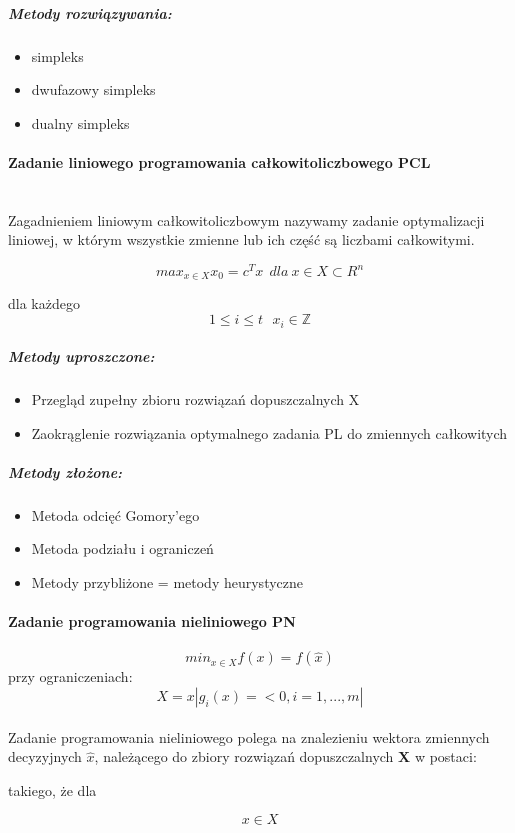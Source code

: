 \documentclass[]{report}
\begin{document}
\subparagraph{Metody rozwiązywania:}
\begin{itemize}
\item simpleks
\item dwufazowy simpleks
\item dualny simpleks
\end{itemize} 
 
\paragraph{Zadanie liniowego programowania całkowitoliczbowego PCL\\\\}

Zagadnieniem liniowym całkowitoliczbowym nazywamy zadanie optymalizacji
liniowej, w którym wszystkie zmienne lub ich część są liczbami całkowitymi.

\[max_{x \in X} x_0 = c^Tx~~dla~x \in X \subset R^n\]


dla każdego $$1 \le i \le t~~~x_i \in \mathbb{Z}$$

\subparagraph{Metody uproszczone:}
\begin{itemize}
\item Przegląd zupełny zbioru rozwiązań dopuszczalnych X
\item Zaokrąglenie rozwiązania optymalnego zadania PL do zmiennych całkowitych
\end{itemize}

\subparagraph{Metody złożone:}
\begin{itemize}
\item Metoda odcięć Gomory'ego
\item Metoda podziału i ograniczeń
\item Metody przybliżone = metody heurystyczne
\end{itemize}


\paragraph{Zadanie programowania nieliniowego PN}

$$min_{x \in X} f(x) = f(\hat{x})$$
przy ograniczeniach:
$$X={x|g_i(x)=<0, i=1,...,m|}$$ 
\\
Zadanie programowania nieliniowego polega na znalezieniu wektora zmiennych decyzyjnych $\hat{x}$, należącego do zbiory rozwiązań dopuszczalnych \textbf{X} w postaci: 

takiego, że dla

$$x \in X$$
\end{document}
